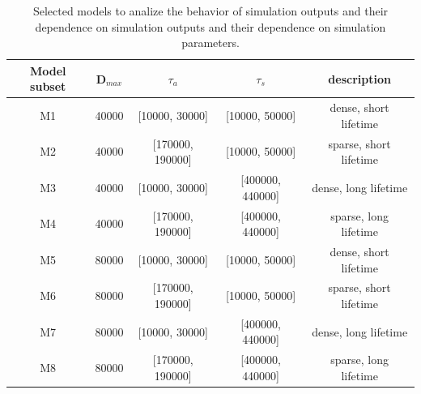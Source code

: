 


\setlength{\tabcolsep}{10pt}
\begin{table}
\centering
\begin{tabular}{ccccc}
\hline
Model subset & D$_{max}$ & $\tau_a$ & $\tau_s$ & description  \\
\hline
M1 & 40000 & [10000, 30000]   & [10000, 50000]   &dense, short lifetime\\
M2 & 40000 & [170000, 190000] & [10000, 50000]   &sparse, short lifetime\\
M3 & 40000 & [10000, 30000]   & [400000, 440000] &dense, long lifetime \\
M4 & 40000 & [170000, 190000] & [400000, 440000] &sparse, long lifetime\\
%
M5 & 80000 & [10000, 30000]   & [10000, 50000]   &dense, short lifetime\\
M6 & 80000 & [170000, 190000] & [10000, 50000]   &sparse, short lifetime\\
M7 & 80000 & [10000, 30000]   & [400000, 440000] &dense, long lifetime \\
M8 & 80000 & [170000, 190000] & [400000, 440000] &sparse, long lifetime\\
%
\hline
\end{tabular}
\caption{Selected models to analize the behavior of simulation outputs
   and their dependence on simulation outputs and their dependence on
   simulation parameters.}
\label{T_selected_models}
\end{table}

 
